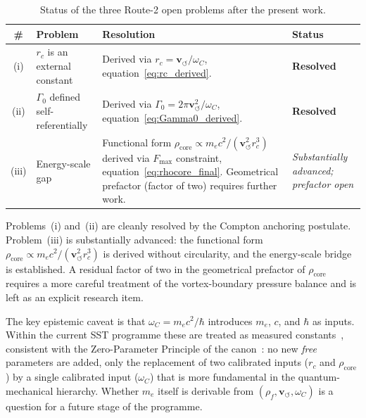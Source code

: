 \documentclass[11pt,a4paper]{article}
\newcommand{\rc}{r_c}
\newcommand{\vswirl}{\mathbf{v}_{\scriptscriptstyle\boldsymbol{\circlearrowleft}}}
\newcommand{\rhof}{\rho_{\!f}}
\newcommand{\rhocore}{\rho_{\!\mathrm{core}}}
\newcommand{\GammaZ}{\Gamma_0}
\newcommand{\omC}{\omega_C}
\begin{document}
\begin{table}[h]
\centering
\caption{Status of the three Route-2 open problems after the present work.}
\label{tab:status}
\begin{tabular}{clp{7.5cm}l}
  \toprule
  \# & Problem & Resolution & Status \\
  \midrule
  (i)  & $\rc$ is an external constant
       & Derived via $\rc=\vswirl/\omC$,
         equation~\eqref{eq:rc_derived}.
       & \textbf{Resolved} \\[4pt]
  (ii) & $\GammaZ$ defined self-referentially
       & Derived via $\GammaZ=2\pi\vswirl^2/\omC$,
         equation~\eqref{eq:Gamma0_derived}.
       & \textbf{Resolved} \\[4pt]
  (iii)& Energy-scale gap
       & Functional form $\rhocore\propto m_ec^2/(\vswirl^2\rc^3)$
         derived via $F_{\max}$ constraint,
         equation~\eqref{eq:rhocore_final}.
         Geometrical prefactor (factor of two) requires further work.
       & \textit{Substantially advanced; prefactor open} \\
  \bottomrule
\end{tabular}
\end{table}

Problems~(i) and~(ii) are cleanly resolved by the Compton anchoring
postulate.  Problem~(iii) is substantially advanced: the functional
form $\rhocore\propto m_ec^2/(\vswirl^2\rc^3)$ is derived without
circularity, and the energy-scale bridge is established.  A residual
factor of two in the geometrical prefactor of $\rhocore$ requires a
more careful treatment of the vortex-boundary pressure balance and
is left as an explicit research item.

The key epistemic caveat is that $\omC=m_ec^2/\hbar$
introduces $m_e$, $c$, and $\hbar$ as inputs.  Within the current
SST programme these are treated as measured constants~\cite{MohrTaylor2016},
consistent with the Zero-Parameter Principle of the
canon~\cite{IskandaraniCanon078}: no new \emph{free} parameters are
added, only the replacement of two calibrated inputs
($\rc$ and $\rhocore$) by a single calibrated input ($\omC$) that is
more fundamental in the quantum-mechanical hierarchy.  Whether $m_e$
itself is derivable from $(\rhof,\vswirl,\omC)$ is a question for a
future stage of the programme.
\end{document}
